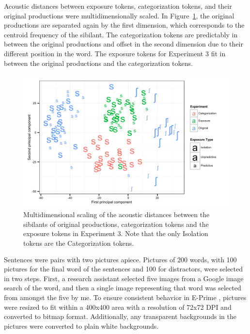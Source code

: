 Acoustic distances between exposure tokens, categorization tokens, and their original productions were multidimensionally scaled.  In Figure~\ref{fig:exp3mds}, the original productions are separated again by the first dimension, which corresponds to the centroid frequency of the sibilant.
The categorization tokens are predictably in between the original productions and offset in the second dimension due to their different position in the word.
The exposure tokens for Experiment 3 fit in between the original productions and the categorization tokens.

\begin{figure}[ht]
\caption{Multidimensional scaling of the acoustic distances between the sibilants of original productions, categorization tokens and the exposure tokens in Experiment 3. Note that the only Isolation tokens are the Categorization tokens.}
\label{fig:exp3mds}
\begin{center}
\includegraphics[width=\textwidth]{graphs/exp3_mds}
\end{center}
\end{figure}

Sentences were pairs with two pictures apiece.
Pictures of 200 words, with 100 pictures for the final word of the sentences and 100 for distractors, were selected in two steps.  
First, a research assistant selected five images from a Google image search of the word, and then a single image representing that word was selected from amongst the five by me.  
To ensure consistent behavior in E-Prime \citep{PsychologySoftwareTools2012}, pictures were resized to fit within a 400x400 area with a resolution of 72x72 DPI and converted to bitmap format.  
Additionally, any transparent backgrounds in the pictures were converted to plain white backgrounds.

